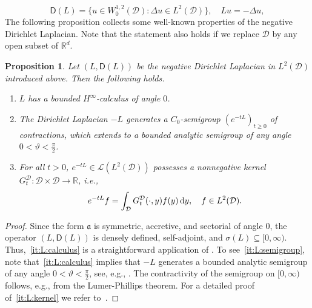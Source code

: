 \documentclass[12pt,a4paper, reqno]{amsart}
\theoremstyle{plain}
\newtheorem{proposition}[theorem]{Proposition}
\theoremstyle{definition}
\theoremstyle{remark}
\numberwithin{equation}{section}
\newcommand{\1}{\mathbbm{1}}
\newcommand{\dd}{\textup{d}}
\newcommand{\R}{\ensuremath{\mathbb{R}}}
\newcommand{\calD}{\ensuremath{\mathcal{D}}}
\newcommand{\sL}{\ensuremath{\mathscr{L}}}
\newcommand{\sfD}{\ensuremath{\mathsf{D}}}
\newcommand{\fraka}{\ensuremath{\mathfrak{a}}}
\begin{document}
    \[ \sfD(L)=\{ u\in W_0^{1,2}(\calD)\colon \Delta u\in L^2(\calD) \},\quad L u = -\Delta u,  \]
    The following proposition collects some well-known properties of the negative Dirichlet Laplacian.
    Note that the statement also holds if we replace $\calD$ by any open subset of $\R^d$. 
    \begin{proposition}\label{functionalcalculus:variationalsetting}
      Let $(L,\sfD(L))$ be the negative Dirichlet Laplacian in $L^2(\calD)$ introduced above. Then the following holds. 
    \begin{enumerate}[label=\textup{(\roman*)}]
        \item\label{it:L:calculus} $L$ has a bounded $H^\infty$-calculus of angle $0$.
        \item\label{it:L:semigroup} The Dirichlet Laplacian $-L$ generates a $C_0$-semigroup $(e^{-tL})_{t\geq 0}$ of contractions, which extends to a bounded analytic semigroup of any angle $0<\vartheta <\frac{\pi}{2}$.
        \item\label{it:L:kernel} For all $t>0$, $e^{-tL}\in\sL(L^2(\calD))$ possesses a nonnegative kernel 
        $G_t^\calD\colon\calD\times\calD\to\R$, i.e.,
        \[
        e^{-tL}f = \int_\calD G_t^\calD(\cdot,y)f(y)\,\dd y, \quad f\in L^2(\calD). 
        \]
    \end{enumerate}
    \end{proposition}
    \begin{proof}
    Since the form $\fraka$ is symmetric, accretive, and sectorial of angle $0$, the operator $(L,\sfD(L))$ is densely defined, self-adjoint, and $\sigma(L)\subseteq[0,\infty)$. Thus,~\ref{it:L:calculus} is a straightforward application of \cite[Proposition~10.2.23]{aibs2}.
    To see~\ref{it:L:semigroup}, note that~\ref{it:L:calculus} implies that $-L$ generates a bounded analytic semigroup  of any angle $0<\vartheta<\frac{\pi}{2}$, see, e.g., \cite[Theorem~G.5.2]{aibs2}. The contractivity of the semigroup on $[0,\infty)$ follows, e.g., from the Lumer-Phillips theorem.  For a detailed proof of~\ref{it:L:kernel} we refer to~\cite[Theorem~4.2.4]{Are06}. 
    \end{proof}

 
\end{document}
